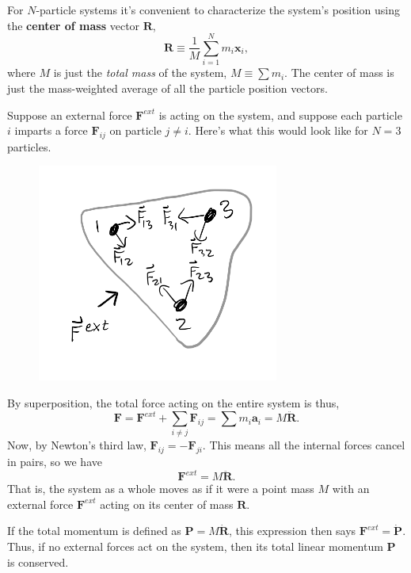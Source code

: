 \documentclass[
  letterpaper,
  DIV=11,
  numbers=noendperiod]{scrreprt}
\begin{document}
For \(N\)-particle systems it's convenient to characterize the system's
position using the \textbf{center of mass} vector \(\mathbf{R}\), \[
\mathbf{R} \equiv \frac{1}{M}\sum_{i=1}^N m_i \mathbf{x}_i,
\] where \(M\) is just the \emph{total mass} of the system,
\(M \equiv \sum m_i\). The center of mass is just the mass-weighted
average of all the particle position vectors.

Suppose an external force \(\mathbf{F}^{ext}\) is acting on the system,
and suppose each particle \(i\) imparts a force \(\mathbf{F}_{ij}\) on
particle \(j \neq i\). Here's what this would look like for \(N=3\)
particles.

\begin{figure}

{\centering \includegraphics[width=3.125in,height=\textheight]{classical-mechanics/./resources/image-20230212034236830.png}

}

\end{figure}

By superposition, the total force acting on the entire system is thus,
\[
\mathbf{F} = \mathbf{F}^{ext} + \sum_{i \neq j} \mathbf{F}_{ij} = \sum m_i \mathbf{a}_i = M\mathbf{\ddot R}.
\] Now, by Newton's third law, \(\mathbf{F}_{ij} = -\mathbf{F}_{ji}\).
This means all the internal forces cancel in pairs, so we have \[
\mathbf{F}^{ext} = M\mathbf{\ddot R}.
\] That is, the system as a whole moves as if it were a point mass \(M\)
with an external force \(\mathbf{F}^{ext}\) acting on its center of mass
\(\mathbf{R}\).

If the total momentum is defined as \(\mathbf{P} = M \mathbf{\dot R}\),
this expression then says \(\mathbf{F}^{ext} = \mathbf{\dot P}\). Thus,
if no external forces act on the system, then its total linear momentum
\(\mathbf{P}\) is conserved.
\end{document}
